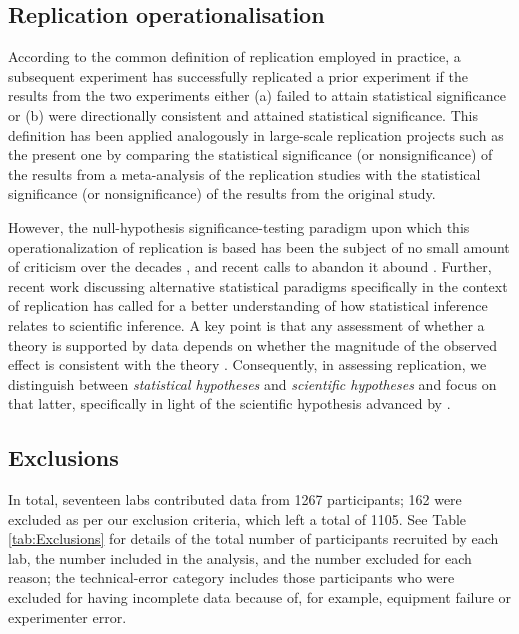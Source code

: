 \documentclass[man,floatsintext]{apa6}
\theoremstyle{definition}
\theoremstyle{definition}
\theoremstyle{definition}
\theoremstyle{remark}
\begin{document}
\subsection{Replication
operationalisation}\label{replication-operationalisation}

According to the common definition of replication employed in practice,
a subsequent experiment has successfully replicated a prior experiment
if the results from the two experiments either (a) failed to attain
statistical significance or (b) were directionally consistent and
attained statistical significance. This definition has been applied
analogously in large-scale replication projects such as the present one
by comparing the statistical significance (or nonsignificance) of the
results from a meta-analysis of the replication studies with the
statistical significance (or nonsignificance) of the results from the
original study.

However, the null-hypothesis significance-testing paradigm upon which
this operationalization of replication is based has been the subject of
no small amount of criticism over the decades
\autocites{Rozenboom}{Meehl1978}{Cohen1994}{Gelman2003}{McShane2016}{McShane2017},
and recent calls to abandon it abound
\autocites{Amrhein}{mcshane2019}{Wasserstein}{AmrheinGreendlandMcShane}.
Further, recent work discussing alternative statistical paradigms
specifically in the context of replication \autocite{CollingSzucs} has
called for a better understanding of how statistical inference relates
to scientific inference. A key point is that any assessment of whether a
theory is supported by data depends on whether the magnitude of the
observed effect is consistent with the theory \autocite{Gelman:effect}.
Consequently, in assessing replication, we distinguish between
\emph{statistical hypotheses} and \emph{scientific hypotheses} and focus
on that latter, specifically in light of the scientific hypothesis
advanced by \textcite{Fischer:2003ju}.

\subsection{Exclusions}\label{exclusions}

In total, seventeen labs contributed data from 1267 participants; 162
were excluded as per our exclusion criteria, which left a total of 1105.
See Table \ref{tab:Exclusions} for details of the total number of
participants recruited by each lab, the number included in the analysis,
and the number excluded for each reason; the technical-error category
includes those participants who were excluded for having incomplete data
because of, for example, equipment failure or experimenter error.
\end{document}
